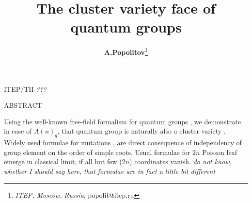 \documentclass{article}
\title{{\bf The cluster variety face of quantum groups} \vspace{.2cm}}
\author{{\bf A.Popolitov}\thanks{{\small
{\it ITEP, Moscow, Russia}}; popolit@itep.ru}}
\newcommand {\?}{\textit{???}}
\newcommand{\YAMLSectionize}[1]{}
\begin{document}
 \maketitle

\vspace{-5.0cm}

\begin{center}
\hfill ITEP/TH-\?\\
\end{center}

\vspace{3.5cm}

\centerline{ABSTRACT}

\bigskip

{\footnotesize
Using the well-known free-field formalism for quantum groups \cite{MV1}, we demonstrate
in case of $A(n)_q$, that quantum group is naturally also a cluster variety \cite{FG1}.
Widely used \cite{Hik1} formulae for mutations \cite{FG1},\cite{FG2} are
direct consequence of independency of group element on the order of simple roots.
Usual formulae \cite{Mars1} for $2 n$ Poisson leaf emerge in classical limit,
if all but few ($2n$) coordinates vanish.
{\it do not know, whether I should say here, that formulae are in fact a little
bit different}
}


\YAMLSectionize{
# The sketch and logic of the presentation
- Introduction :
  - first a blah-blah-blah on how quantum groups are great and important objects,
    and cluster varieties - even more important
  - convenient MV parametrization of group element and commutational relations
  - convenient MFG parametrization of group element
  - mutations
- Body :
  - Details :
    commutational relations for dual algebra from comultiplication :
      - brief overview of original Morozov-Vinet
      - (done) derivation for sl(2)
      - (wontfix) derivation for sl(3)
      - (done) derivation for sl(n)
    connection between multicartan and Gauss parametrization
      - (done) sl(2) fundamental
      - (done) sl(n)
    commutational relations for multicartan parametrization
      - (wontfix) sl(2)
      - (wontfix) sl(n)
    mutations
      - (done) sl(2) fundamental
      - sl(n) fundamental reduces to sl(2)
      - sl(2) first symmetrical
- Conclusion
}

\bigskip

\bigskip

\end{document}
